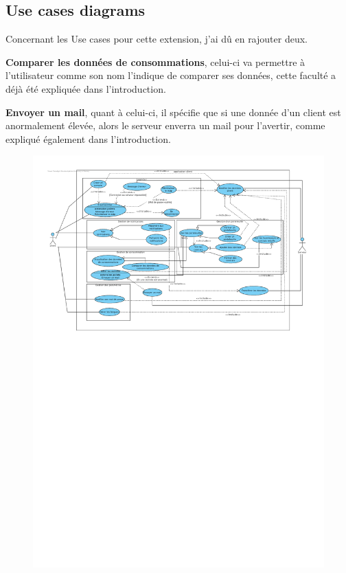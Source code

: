 \subsection{Use cases diagrams}

\begin{flushleft}
Concernant les Use cases pour cette extension, j'ai dû en rajouter deux.
\end{flushleft}

\begin{flushleft}
\textbf{Comparer les données de consommations}, celui-ci va permettre à l'utilisateur comme son nom l'indique de comparer ses données, cette faculté a déjà été expliquée dans l'introduction.
\end{flushleft}

\begin{flushleft}
\textbf{Envoyer un mail}, quant à celui-ci, il spécifie que si une donnée d'un client est anormalement élevée, alors le serveur enverra un mail pour l'avertir, comme expliqué également dans l'introduction.
\end{flushleft}

\begin{figure}[h]
\centering
\includegraphics[width=1.3\textwidth]{extension-adrien/Use-case/img/use-case.pdf}
\end{figure}
